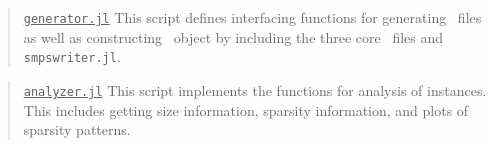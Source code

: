 \begin{quotation}
	\noindent\underline{\texttt{generator.jl}} This script defines interfacing functions for generating \smps\ files as well as constructing \jumpmodel\ object by including the three core \julia\ files and \texttt{smpswriter.jl}.
\end{quotation}

\begin{quotation}
	\noindent\underline{\texttt{analyzer.jl}} This script implements the functions for analysis of instances. This includes getting size information, sparsity information, and plots of sparsity patterns.
\end{quotation}



